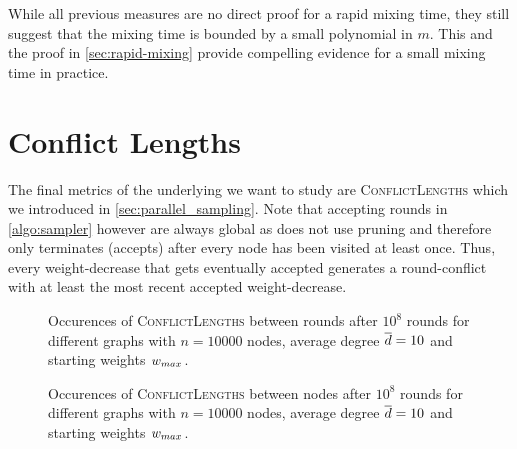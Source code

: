 \bigskip

While all previous measures are no direct proof for a rapid mixing time, they still suggest that the mixing time is bounded by a small polynomial in $m$.
This and the proof in \cref{sec:rapid-mixing} provide compelling evidence for a small mixing time in practice.


\section{Conflict Lengths}\label{sec:exp_conflicts}
The final metrics of the underlying \markov we want to study are \textsc{ConflictLengths} which we introduced in \cref{sec:parallel_sampling}.
Note that accepting rounds in \cref{algo:sampler} however are always global as \algbf does not use pruning and therefore only terminates (accepts) after every node has been visited at least once.
Thus, every weight-decrease that gets eventually accepted generates a round-conflict with at least the most recent accepted weight-decrease.

\begin{figure}[!tb]
  \centering
  \caption{
    Occurences of \textsc{ConflictLengths} between rounds after $10^8$ rounds for different graphs with $n = 10000$ nodes, average degree $\overline{d} = 10$ and starting weights $w_{max}$.
  }
  \label{fig:conflict_lengths_rounds}
\end{figure}

\begin{figure}[!tb]
  \centering
  \caption{
    Occurences of \textsc{ConflictLengths} between nodes after $10^8$ rounds for different graphs with $n = 10000$ nodes, average degree $\overline{d} = 10$ and starting weights $w_{max}$.
  }
  \label{fig:conflict_lengths_nodes}
\end{figure}

